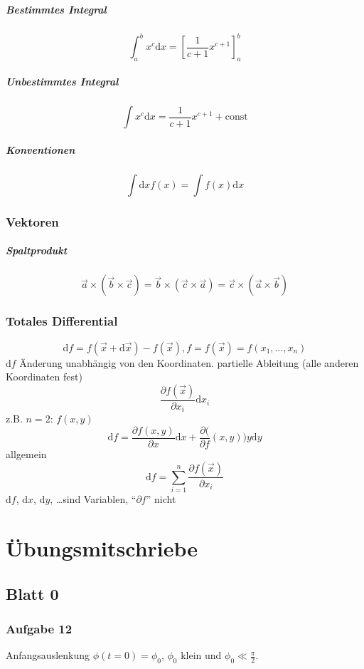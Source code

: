 \documentclass[oneside]{book}
\theoremstyle{definition}
\renewcommand{\d}{\mathrm d}
\newcommand{\ffpartial}[2]{\frac{\partial #1}{\partial #2}}
\begin{document}
\paragraph{Bestimmtes Integral}
$$\int_a^b x^c \d x = [ \frac1{c + 1} x^{c+1}]_a^b$$

\paragraph{Unbestimmtes Integral}
$$\int x^c \d x = \frac1{c+1} x^{c+1} + \mathrm{const}$$

\paragraph{Konventionen}
$$\int \d x f(x) = \int f(x) \d x$$

\subsection{Vektoren}
\paragraph{Spaltprodukt}
$$\vec a \times (\vec b \times \vec c) = \vec b \times (\vec c \times \vec a) = \vec c \times (\vec a \times \vec b)$$

\subsection{Totales Differential}
$$\d f = f(\vec{x} + \d \vec{x}) - f(\vec{x}), f = f(\vec{x}) = f(x_1, \dots, x_n)$$
$\d f$ Änderung unabhängig von den Koordinaten.
partielle Ableitung (alle anderen Koordinaten fest)
$$\ffpartial{f(\vec{x})}{x_i} \d x_i$$
z.B. $n = 2$: $f (x, y)$
$$\d f = \ffpartial{f(x,y)}{x} \d x + \ffpartial(f(x,y)){y} \d y$$
allgemein
$$\d f = \sum_{i=1}^n \ffpartial{f(\vec{x})}{x_i}$$
$\d f$, $\d x$, $\d y$, \dots sind Variablen, "`$\partial f$"' nicht

\chapter{Übungsmitschriebe}

\section{Blatt 0}
\subsection{Aufgabe 12}
Anfangsauslenkung $\phi(t = 0) = \phi_0$, $\phi_0$ klein und $\phi_0 \ll \frac{\pi}{2}$.
\end{document}
